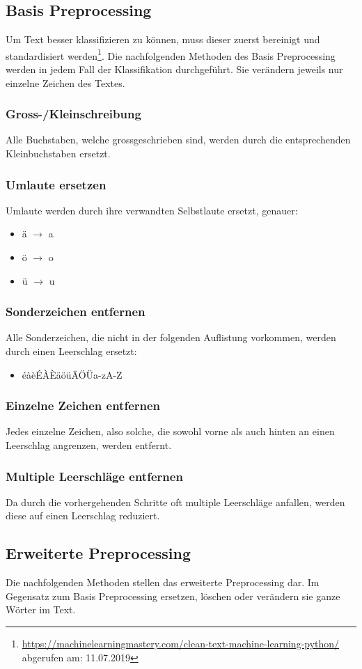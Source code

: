 \subsection{Basis Preprocessing}
Um Text besser klassifizieren zu können, muss dieser zuerst bereinigt und standardisiert werden\footnote{\url{https://machinelearningmastery.com/clean-text-machine-learning-python/} abgerufen am: 11.07.2019}.
Die nachfolgenden Methoden des Basis Preprocessing werden in jedem Fall der Klassifikation durchgeführt.
Sie verändern jeweils nur einzelne Zeichen des Textes.
\subsubsection{Gross-/Kleinschreibung}
Alle Buchstaben, welche grossgeschrieben sind, werden durch die entsprechenden Kleinbuchstaben ersetzt.
\subsubsection{Umlaute ersetzen}
Umlaute werden durch ihre verwandten Selbstlaute ersetzt, genauer:
\begin{itemize}
	\item ä $\rightarrow$ a
	\item ö $\rightarrow$ o
	\item ü $\rightarrow$ u
\end{itemize} 
\subsubsection{Sonderzeichen entfernen}
Alle Sonderzeichen, die nicht in der folgenden Auflistung vorkommen, werden durch einen Leerschlag ersetzt:
\begin{itemize}
	\item éàèÉÀÈäöüÄÖÜa-zA-Z
\end{itemize} 
\subsubsection{Einzelne Zeichen entfernen}
Jedes einzelne Zeichen, also solche, die sowohl vorne als auch hinten an einen Leerschlag angrenzen, werden entfernt.
\subsubsection{Multiple Leerschläge entfernen}
Da durch die vorhergehenden Schritte oft multiple Leerschläge anfallen, werden diese auf einen Leerschlag reduziert.
\subsection{Erweiterte Preprocessing}\label{sec:advancedpre}
Die nachfolgenden Methoden stellen das erweiterte Preprocessing dar.
Im Gegensatz zum Basis Preprocessing ersetzen, löschen oder verändern sie ganze Wörter im Text.
